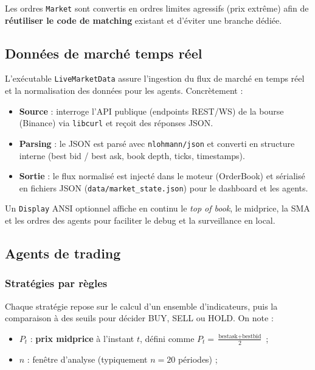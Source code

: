 \documentclass[11pt,a4paper]{article}
\begin{document}
Les ordres \texttt{Market} sont convertis en ordres limites
agressifs (prix extrême) afin de \textbf{réutiliser le code
de matching} existant et d'éviter une branche dédiée.

\subsection{Données de marché temps réel}

L'exécutable \texttt{LiveMarketData} assure l'ingestion du flux de
marché en temps réel et la normalisation des données pour les
agents. Concrètement :

\begin{itemize}[leftmargin=1.2cm]
    \item \textbf{Source} : interroge l'API publique (endpoints REST/WS)
          de la bourse (Binance) via \texttt{libcurl} et reçoit des
          réponses JSON.
    \item \textbf{Parsing} : le JSON est parsé avec
          \texttt{nlohmann/json} et converti en structure interne
          (best bid / best ask, book depth, ticks, timestamps).
    \item \textbf{Sortie} : le flux normalisé est injecté dans le
          moteur (OrderBook) et sérialisé en fichiers JSON
          (\texttt{data/market\_state.json}) pour le dashboard et les
          agents.
\end{itemize}

Un \texttt{Display} ANSI optionnel affiche en continu le \textit{top of
book}, le midprice, la SMA et les ordres des agents pour faciliter le
debug et la surveillance en local.

\subsection{Agents de trading}

\subsubsection{Stratégies par règles}

Chaque stratégie repose sur le calcul d'un ensemble d'indicateurs,
puis la comparaison à des seuils pour décider BUY, SELL ou HOLD.
On note :
\begin{itemize}[leftmargin=1.2cm]
    \item $P_t$ : \textbf{prix midprice} à l'instant $t$, défini comme
          $P_t = \frac{\text{bestask} + \text{bestbid}}{2}$ ;
    \item $n$ : fenêtre d'analyse (typiquement $n=20$ périodes) ;
\end{itemize}
\end{document}
